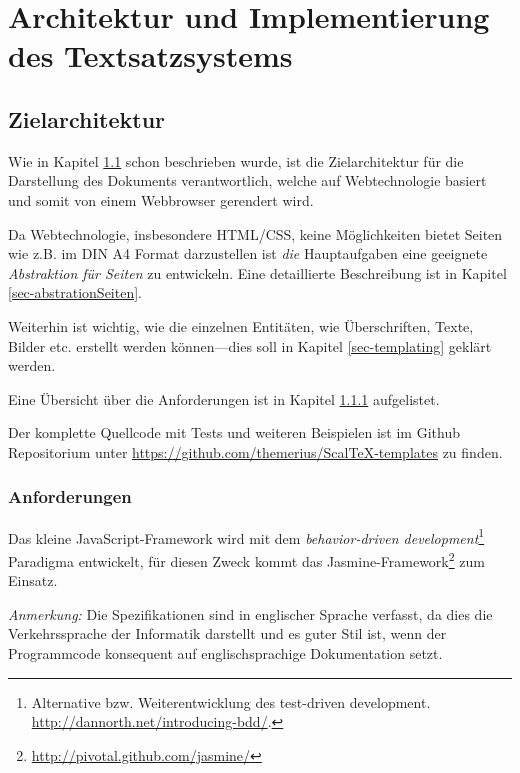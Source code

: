 \chapter{Architektur und Implementierung des Textsatzsystems}\label{ch-architektur}

\section{Zielarchitektur}\label{sec-zielarchitektur}

Wie in Kapitel \ref{sec-zielarchitektur} schon beschrieben wurde, ist die
Zielarchitektur für die Darstellung des Dokuments verantwortlich, welche
auf Webtechnologie basiert und somit von einem Webbrowser gerendert wird.

Da Webtechnologie, insbesondere HTML/CSS, keine Möglichkeiten bietet
Seiten wie z.B. im DIN A4 Format darzustellen ist \emph{die}
Hauptaufgaben eine geeignete \emph{Abstraktion für Seiten} zu entwickeln.
Eine detaillierte Beschreibung ist in Kapitel \ref{sec-abstrationSeiten}.

Weiterhin ist wichtig, wie die einzelnen Entitäten, wie Überschriften,
Texte, Bilder etc. erstellt werden können---dies soll in Kapitel
\ref{sec-templating} geklärt werden.

Eine Übersicht über die Anforderungen ist in Kapitel
\ref{sec-ziel_anforderungen} aufgelistet.

Der komplette Quellcode mit Tests und weiteren Beispielen ist im
Github Repositorium unter \url{https://github.com/themerius/ScalTeX-templates}
zu finden.

\subsection{Anforderungen}\label{sec-ziel_anforderungen}

Das kleine JavaScript-Framework wird mit dem
\emph{behavior-driven development}\footnote{
Alternative bzw. Weiterentwicklung des test-driven development.
\url{http://dannorth.net/introducing-bdd/}.}
Paradigma entwickelt, für diesen Zweck kommt das
Jasmine-Framework\footnote{\url{http://pivotal.github.com/jasmine/}}
zum Einsatz.

\emph{Anmerkung:}
Die Spezifikationen sind in englischer Sprache verfasst, da dies die
Verkehrssprache der Informatik darstellt und es guter Stil ist, wenn der
Programmcode konsequent auf englischsprachige Dokumentation setzt.

